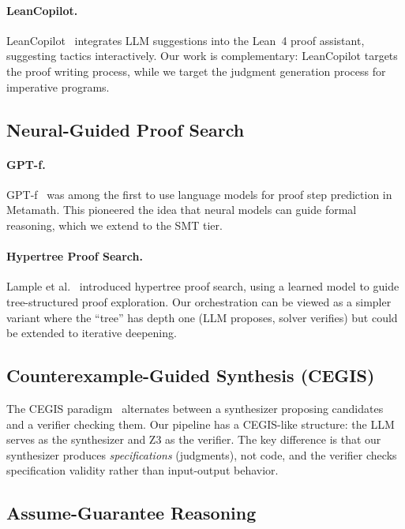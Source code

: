 \documentclass[11pt]{article}
\begin{document}
\paragraph{LeanCopilot.}
LeanCopilot~\cite{LeanCopilot2023} integrates LLM suggestions into the
Lean~4 proof assistant, suggesting tactics interactively.  Our work is
complementary: LeanCopilot targets the proof writing process, while we
target the judgment generation process for imperative programs.

\subsection{Neural-Guided Proof Search}

\paragraph{GPT-f.}
GPT-f~\cite{GPTf2020} was among the first to use language models for
proof step prediction in Metamath.  This pioneered the idea that
neural models can guide formal reasoning, which we extend to the
SMT tier.

\paragraph{Hypertree Proof Search.}
Lample et al.~\cite{HyperTree2022} introduced hypertree proof search,
using a learned model to guide tree-structured proof exploration.
Our orchestration can be viewed as a simpler variant where the
``tree'' has depth one (LLM proposes, solver verifies) but could be
extended to iterative deepening.

\subsection{Counterexample-Guided Synthesis (CEGIS)}

The CEGIS paradigm~\cite{CEGIS2013} alternates between a synthesizer
proposing candidates and a verifier checking them.  Our pipeline has
a CEGIS-like structure: the LLM serves as the synthesizer and Z3 as
the verifier.  The key difference is that our synthesizer produces
\emph{specifications} (judgments), not code, and the verifier checks
specification validity rather than input-output behavior.

\subsection{Assume-Guarantee Reasoning}
\end{document}
